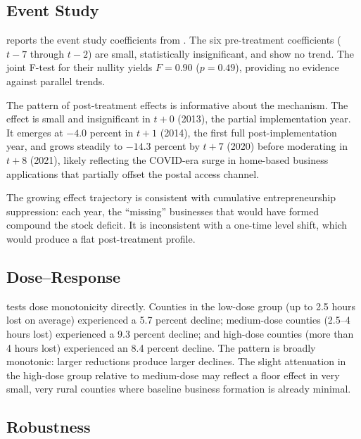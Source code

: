 \documentclass[12pt]{article}
\begin{document}
\subsection{Event Study}



 reports the event study coefficients from . The six pre-treatment coefficients ($t-7$ through $t-2$) are small, statistically insignificant, and show no trend. The joint F-test for their nullity yields $F = 0.90$ ($p = 0.49$), providing no evidence against parallel trends.

The pattern of post-treatment effects is informative about the mechanism. The effect is small and insignificant in $t+0$ (2013), the partial implementation year. It emerges at $-4.0$ percent in $t+1$ (2014), the first full post-implementation year, and grows steadily to $-14.3$ percent by $t+7$ (2020) before moderating in $t+8$ (2021), likely reflecting the COVID-era surge in home-based business applications that partially offset the postal access channel.

The growing effect trajectory is consistent with cumulative entrepreneurship suppression: each year, the ``missing'' businesses that would have formed compound the stock deficit. It is inconsistent with a one-time level shift, which would produce a flat post-treatment profile.

\subsection{Dose--Response}



 tests dose monotonicity directly. Counties in the low-dose group (up to 2.5 hours lost on average) experienced a 5.7 percent decline; medium-dose counties (2.5--4 hours lost) experienced a 9.3 percent decline; and high-dose counties (more than 4 hours lost) experienced an 8.4 percent decline. The pattern is broadly monotonic: larger reductions produce larger declines. The slight attenuation in the high-dose group relative to medium-dose may reflect a floor effect in very small, very rural counties where baseline business formation is already minimal.

\subsection{Robustness}
\end{document}
